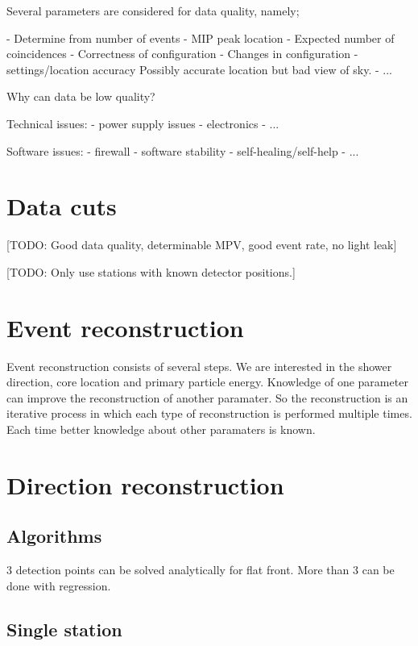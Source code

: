 Several parameters are considered for data quality, namely;

- Determine from number of events
- MIP peak location
- Expected number of coincidences
- Correctness of configuration
- Changes in configuration
- \gps settings/location accuracy
    Possibly accurate location but bad view of sky.
- ...


Why can data be low quality?

Technical issues:
- power supply issues
- electronics
- ...

Software issues:
- firewall
- software stability
- self-healing/self-help
- ...


\section{Data cuts}

[TODO: Good data quality, determinable MPV, good event rate, no light leak]

[TODO: Only use stations with known detector positions.]


\section{Event reconstruction}

Event reconstruction consists of several steps. We are interested in the
shower direction, core location and primary particle energy. Knowledge
of one  parameter can improve the reconstruction of another paramater.
So the reconstruction is an iterative process in which each type of
reconstruction is performed multiple times. Each time better knowledge
about other paramaters is known.


\section{Direction reconstruction}

\subsection{Algorithms}

3 detection points can be solved analytically for flat front.
More than 3 can be done with regression.


\subsection{Single station}

